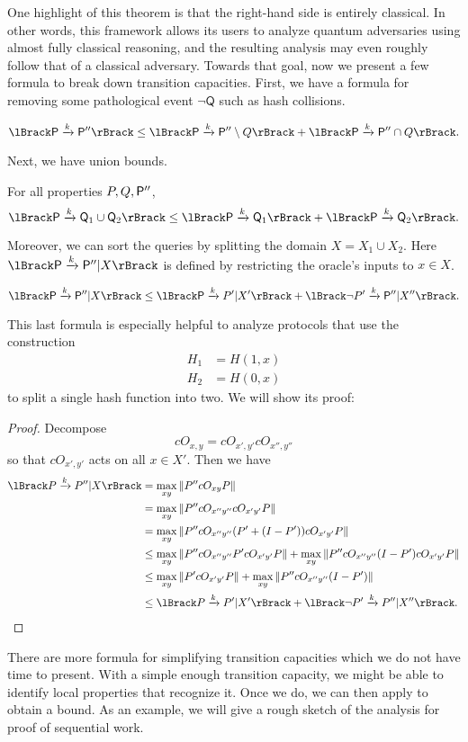 One highlight of this theorem is that the right-hand side is entirely classical.
In other words, this framework allows its users to analyze quantum adversaries using almost fully classical reasoning,
and the resulting analysis may even roughly follow that of a classical adversary.
Towards that goal, now we present a few formula to break down transition capacities.
First, we have a formula for removing some pathological event $\neg\mathsf{Q}$ such as hash collisions.
\begin{lem}
	$$
	\lBrack\sfP\xrightarrow{k}\sfP''\rBrack\leq
	\lBrack\sfP\xrightarrow{k} \sfP''\setminus Q\rBrack+
	\lBrack\sfP\xrightarrow{k} \sfP''\cap Q\rBrack.
	$$
\end{lem}
Next, we have union bounds.
\begin{lem}
For all properties $P, Q, \mathsf{P}''$,
$$
	\lBrack\sfP\xrightarrow{k}\sfQ_1\cup\sfQ_2\rBrack\leq
	\lBrack\sfP\xrightarrow{k}\sfQ_1\rBrack+
	\lBrack\sfP\xrightarrow{k}\sfQ_2\rBrack.
$$
\end{lem}
Moreover, we can sort the queries by splitting the domain $X=X_1\cup X_2$.
Here $\lBrack\sfP\xrightarrow{k} \sfP''|X\rBrack$ is defined by restricting the oracle's inputs to $x\in X$.
\begin{lem}
$$
	\lBrack\sfP\xrightarrow{k} \sfP''|X\rBrack\leq
	\lBrack\sfP\xrightarrow{k} P'|X'\rBrack+
	\lBrack\neg P'\xrightarrow{k} \sfP''|X''\rBrack.
$$
\end{lem}
This last formula is especially helpful to analyze protocols that use the construction
\begin{align*}
	H_1&=H(1, x) \\
	H_2&=H(0, x)
\end{align*}
to split a single hash function into two.
We will show its proof:
\begin{proof}
	Decompose
	$$cO_{x,y}=cO_{x',y'}cO_{x'',y''}$$
	so that $cO_{x',y'}$ acts on all $x\in X'$.
	Then we have
\begin{align*}
	\lBrack P\xrightarrow{k} P''|X\rBrack &=\max_{xy}\norm{P''cO_{xy}P}\\
			&=\max_{xy}\norm{P''cO_{x''y''}cO_{x'y'}P}\\
			&=\max_{xy}\norm{P''cO_{x''y''}(P' + (I - P'))cO_{x'y'}P}\\
			&\leq\max_{xy}\norm{P''cO_{x''y''}P' cO_{x'y'}P}
			+\max_{xy}\norm{P''cO_{x''y''}(I - P')cO_{x'y'}P}\\
			&\leq\max_{xy}\norm{P' cO_{x'y'}P}
			+\max_{xy}\norm{P''cO_{x''y''}(I - P')}\\
			&\leq
			\lBrack P\xrightarrow{k} P'|X'\rBrack +
			\lBrack \neg P'\xrightarrow{k} P''|X''\rBrack .
\end{align*}
\end{proof}

There are more formula for simplifying transition capacities which we do not have time to present.
With a simple enough transition capacity,
we might be able to identify local properties that recognize it.
Once we do, we can then apply  to obtain a bound.
As an example, we will give a rough sketch of the analysis for proof of sequential work.

